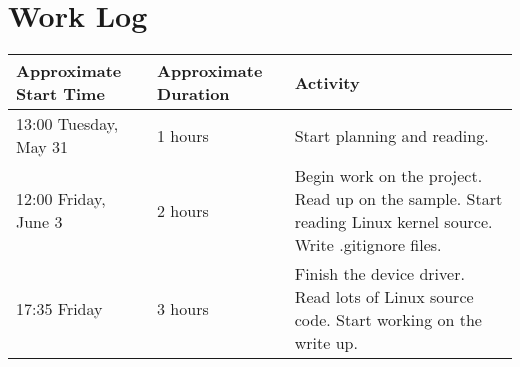 \documentclass[10pt,conference,draftclsnofoot,onecolumn]{IEEEtran}
\begin{document}
\section{Work Log}
\begin{tabular}{|p{5cm}|p{5cm}|p{5cm}}
    \textbf{Approximate Start Time} & \textbf{Approximate Duration} & \textbf{Activity} \\
    \hline
    13:00 Tuesday, May 31 & 1 hours & Start planning and reading. \\
    12:00 Friday, June 3 & 2 hours & Begin work on the project. Read up on the sample. Start reading Linux kernel source. Write .gitignore files. \\
    17:35 Friday& 3 hours & Finish the device driver. Read lots of Linux source code. Start working on the write up. \\
\end{tabular}


\clearpage
\printbibliography

\clearpage

\begin{appendices}


\end{appendices}
\end{document}
